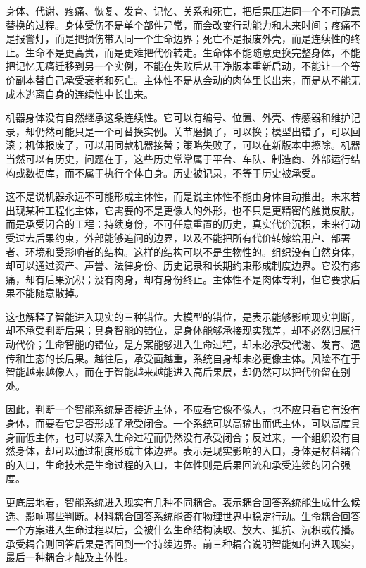身体、代谢、疼痛、恢复、发育、记忆、关系和死亡，把后果压进同一个不可随意替换的过程。身体受伤不是单个部件异常，而会改变行动能力和未来时间；疼痛不是报警灯，而是把损伤带入同一个生命边界；死亡不是报废外壳，而是连续性的终止。生命不是更高贵，而是更难把代价转走。生命体不能随意更换完整身体，不能把记忆无痛迁移到另一个实例，不能在失败后从干净版本重新启动，不能让一个等价副本替自己承受衰老和死亡。主体性不是从会动的肉体里长出来，而是从不能无成本逃离自身的连续性中长出来。

机器身体没有自然继承这条连续性。它可以有编号、位置、外壳、传感器和维护记录，却仍然可能只是一个可替换实例。关节磨损了，可以换；模型出错了，可以回滚；机体报废了，可以用同款机器接替；策略失败了，可以在新版本中擦除。机器当然可以有历史，问题在于，这些历史常常属于平台、车队、制造商、外部运行结构或数据库，而不属于执行个体自身。历史被记录，不等于历史被承受。


这不是说机器永远不可能形成主体性，而是说主体性不能由身体自动推出。未来若出现某种工程化主体，它需要的不是更像人的外形，也不只是更精密的触觉皮肤，而是承受闭合的工程：持续身份，不可任意重置的历史，真实代价沉积，未来行动受过去后果约束，外部能够追问的边界，以及不能把所有代价转嫁给用户、部署者、环境和受影响者的结构。这样的结构可以不是生物性的。组织没有自然身体，却可以通过资产、声誉、法律身份、历史记录和长期约束形成制度边界。它没有疼痛，却有后果沉积；没有肉身，却有身份终止。主体性不是肉体专利，但它要求后果不能随意散掉。

这也解释了智能进入现实的三种错位。大模型的错位，是表示能够影响现实判断，却不承受判断后果；具身智能的错位，是身体能够承接现实残差，却不必然归属行动代价；生命智能的错位，是方案能够进入生命过程，却未必承受代谢、发育、遗传和生态的长后果\cite{floridi2013distributed}\cite{nissenbaum1996accountability}。越往后，承受面越重，系统自身却未必更像主体。风险不在于智能越来越像人，而在于智能越来越能进入高后果层，却仍然可以把代价留在别处。

因此，判断一个智能系统是否接近主体，不应看它像不像人，也不应只看它有没有身体，而要看它是否形成了承受闭合。一个系统可以高输出而低主体，可以高度具身而低主体，也可以深入生命过程而仍然没有承受闭合；反过来，一个组织没有自然身体，却可以通过制度形成主体边界。表示是现实影响的入口，身体是材料耦合的入口，生命技术是生命过程的入口，主体性则是后果回流和承受连续的闭合强度。


更底层地看，智能系统进入现实有几种不同耦合。表示耦合回答系统能生成什么候选、影响哪些判断。材料耦合回答系统能否在物理世界中稳定行动。生命耦合回答一个方案进入生命过程以后，会被什么生命结构读取、放大、抵抗、沉积或传播。承受耦合则回答后果是否回到一个持续边界。前三种耦合说明智能如何进入现实，最后一种耦合才触及主体性。


